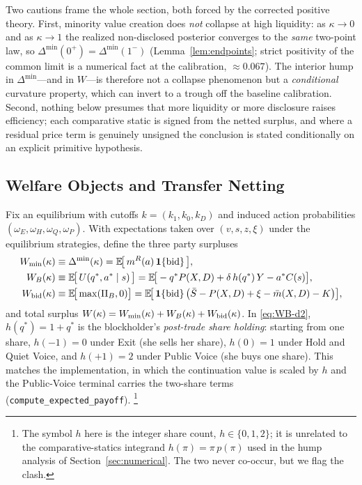 \documentclass[11pt]{article}
\newcommand{\E}{\mathbb{E}}
\newcommand{\1}{\mathbf{1}}
\begin{document}
Two cautions frame the whole section, both forced by the corrected positive
theory. First, minority value creation does \emph{not} collapse at high
liquidity: as $\kappa\to0$ and as $\kappa\to1$ the realized non-disclosed
posterior converges to the \emph{same} two-point law, so
$\Delta^{\min}(0^+)=\Delta^{\min}(1^-)$ (Lemma~\ref{lem:endpoints}; strict
positivity of the common limit is a numerical fact at the calibration,
$\approx0.067$). The interior
hump in $\Delta^{\min}$---and in $W$---is therefore not a collapse phenomenon but
a \emph{conditional} curvature property, which can invert to a trough off the
baseline calibration. Second, nothing below presumes that more liquidity or more
disclosure raises efficiency; each comparative static is signed from the netted
surplus, and where a residual price term is genuinely unsigned the conclusion is
stated conditionally on an explicit primitive hypothesis.

\subsection{Welfare Objects and Transfer Netting}
\label{sec:welf-objects}

Fix an equilibrium with cutoffs $k=(k_1,k_0,k_D)$ and induced action
probabilities $(\omega_E,\omega_H,\omega_Q,\omega_P)$. With expectations taken
over $(v,s,z,\xi)$ under the equilibrium strategies, define the three party
surpluses
\begin{align}
W_{\min}(\kappa) &\equiv \Delta^{\min}(\kappa)
   =\E\!\big[\,m^{R}(a)\,\1\{\textup{bid}\}\,\big], \label{eq:Wmin-d2}\\
W_B(\kappa) &\equiv \E\!\big[\,U(q^{\ast},a^{\ast}\mid s)\,\big]
   =\E\!\big[-q^{\ast}P(X,D)+\delta\,h(q^{\ast})\,Y-a^{\ast}C(s)\big],
   \label{eq:WB-d2}\\
W_{\textup{bid}}(\kappa) &\equiv \E\!\big[\max(\Pi_B,0)\big]
   =\E\!\big[\,\1\{\textup{bid}\}\,\big(\bar S-P(X,D)+\xi-\bar m(X,D)-K\big)\big],
   \label{eq:Wbid-d2}
\end{align}
and total surplus $W(\kappa)=W_{\min}(\kappa)+W_B(\kappa)+W_{\textup{bid}}(\kappa)$.
In \eqref{eq:WB-d2}, $h(q^{\ast})=1+q^{\ast}$ is the blockholder's
\emph{post-trade share holding}: starting from one share, $h(-1)=0$ under Exit
(she sells her share), $h(0)=1$ under Hold and Quiet Voice, and $h(+1)=2$ under
Public Voice (she buys one share). This matches the implementation, in which the
continuation value is scaled by $h$ and the Public-Voice terminal carries the
two-share terms (\texttt{compute\_expected\_payoff}).%
\footnote{The symbol $h$ here is the integer share count, $h\in\{0,1,2\}$; it is
unrelated to the comparative-statics integrand $h(\pi)=\pi\,p(\pi)$ used in the
hump analysis of Section~\ref{sec:numerical}. The two never co-occur, but we flag
the clash.}
\end{document}
